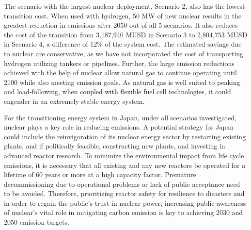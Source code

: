 The scenario with the largest nuclear deployment, Scenario 2, also has the lowest transition cost. When used with hydrogen, 50 MW of new nuclear results in the greatest reduction in emissions after 2050 out of all 5 scenarios. It also reduces the cost of the transition from 3,187,940 MUSD in Scenario 3 to 2,804,753 MUSD in Scenario 4, a difference of 12\% of the system cost. The estimated savings due to nuclear are conservative, as we have not incorporated the cost of transporting hydrogen utilizing tankers or pipelines. Further, the large emission reductions achieved with the help of nuclear allow natural gas to continue operating until 2100 while also meeting emission goals. As natural gas is well suited to peaking and load-following, when coupled with flexible fuel cell technologies, it could engender in an extremely stable energy system. 

For the transitioning energy system in Japan, under all scenarios investigated, nuclear plays a key role in reducing emissions. A potential strategy for Japan could include the reinvigoration of its nuclear energy sector by restarting existing plants, and if politically feasible, constructing new plants, and investing in advanced reactor research. To minimize the environmental impact from life cycle emissions, it is necessary that all existing and any new reactors be operated for a lifetime of 60 years or more at a high capacity factor. Premature decommissioning due to operational problems or lack of public acceptance need to be avoided. Therefore, prioritizing reactor safety for resilience to disasters and in order to regain the public's trust in nuclear power, increasing public awareness of nuclear's vital role in  mitigating carbon emission is key to achieving 2030 and 2050 emission targets.

